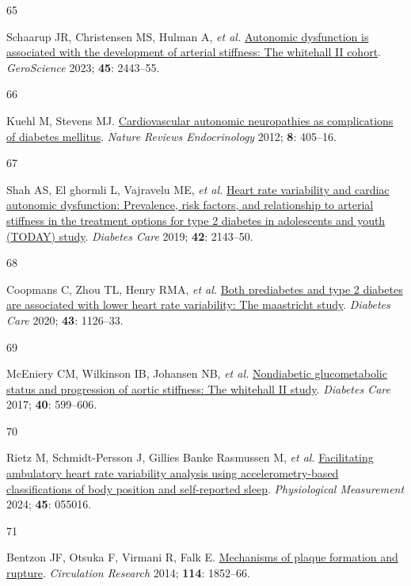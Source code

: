 \documentclass[
  a4paper,
  headsepline=true,
  open=any]{scrbook}
\newlength{\cslhangindent}
\newlength{\csllabelwidth}
\newlength{\cslentryspacingunit} %
\newenvironment{CSLReferences}[2] %
 {%
  \setlength{\parindent}{0pt}
  \ifodd #1
  \let\oldpar\par
  \def\par{\hangindent=\cslhangindent\oldpar}
  \fi
  \setlength{\parskip}{#2\cslentryspacingunit}
 }%
 {}
\newcommand{\CSLLeftMargin}[1]{\parbox[t]{\csllabelwidth}{#1}}
\newcommand{\CSLRightInline}[1]{\parbox[t]{\linewidth - \csllabelwidth}{#1}\break}
\begin{document}
\begin{CSLReferences}{0}{0}
\leavevmode{}%
\CSLLeftMargin{65 }%
\CSLRightInline{Schaarup JR, Christensen MS, Hulman A, \emph{et al.}
\href{https://doi.org/10.1007/s11357-023-00762-0}{Autonomic dysfunction
is associated with the development of arterial stiffness: The whitehall
II cohort}. \emph{GeroScience} 2023; \textbf{45}: 2443--55.}

\leavevmode{}%
\CSLLeftMargin{66 }%
\CSLRightInline{Kuehl M, Stevens MJ.
\href{https://doi.org/10.1038/nrendo.2012.21}{Cardiovascular autonomic
neuropathies as complications of diabetes mellitus}. \emph{Nature
Reviews Endocrinology} 2012; \textbf{8}: 405--16.}

\leavevmode{}%
\CSLLeftMargin{67 }%
\CSLRightInline{Shah AS, El ghormli L, Vajravelu ME, \emph{et al.}
\href{https://doi.org/10.2337/dc19-0993}{Heart rate variability and
cardiac autonomic dysfunction: Prevalence, risk factors, and
relationship to arterial stiffness in the treatment options for type 2
diabetes in adolescents and youth (TODAY) study}. \emph{Diabetes Care}
2019; \textbf{42}: 2143--50.}

\leavevmode{}%
\CSLLeftMargin{68 }%
\CSLRightInline{Coopmans C, Zhou TL, Henry RMA, \emph{et al.}
\href{https://doi.org/10.2337/dc19-2367}{Both prediabetes and type 2
diabetes are associated with lower heart rate variability: The
maastricht study}. \emph{Diabetes Care} 2020; \textbf{43}: 1126--33.}

\leavevmode{}%
\CSLLeftMargin{69 }%
\CSLRightInline{McEniery CM, Wilkinson IB, Johansen NB, \emph{et al.}
\href{https://doi.org/10.2337/dc16-1773}{Nondiabetic glucometabolic
status and progression of aortic stiffness: The whitehall II study}.
\emph{Diabetes Care} 2017; \textbf{40}: 599--606.}

\leavevmode{}%
\CSLLeftMargin{70 }%
\CSLRightInline{Rietz M, Schmidt-Persson J, Gillies Banke Rasmussen M,
\emph{et al.}
\href{https://doi.org/10.1088/1361-6579/ad450d}{Facilitating ambulatory
heart rate variability analysis using accelerometry-based
classifications of body position and self-reported sleep}.
\emph{Physiological Measurement} 2024; \textbf{45}: 055016.}

\leavevmode{}%
\CSLLeftMargin{71 }%
\CSLRightInline{Bentzon JF, Otsuka F, Virmani R, Falk E.
\href{https://doi.org/10.1161/CIRCRESAHA.114.302721}{Mechanisms of
plaque formation and rupture}. \emph{Circulation Research} 2014;
\textbf{114}: 1852--66.}


\end{CSLReferences}
\end{document}
